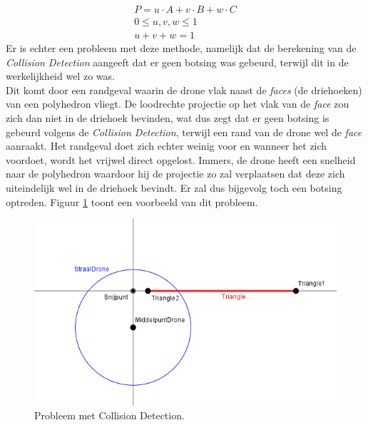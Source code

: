  \begin{gather*}
 	P = u\cdot A + v\cdot B + w\cdot C \\
 	0 \le u,v,w \le 1 \\
 	u + v + w = 1
 \end{gather*}
\noindent
Er is echter een probleem met deze methode, namelijk dat de berekening van de \textit{Collision Detection} aangeeft dat er geen botsing was gebeurd, terwijl dit in de werkelijkheid wel zo was. \\
Dit komt door een randgeval waarin de drone vlak naast de \textit{faces} (de driehoeken) van een polyhedron vliegt. De loodrechte projectie op het vlak van de \textit{face} zou zich dan niet in de driehoek bevinden, wat dus zegt dat er geen botsing is gebeurd volgens de \textit{Collision Detection}, terwijl een rand van de drone wel de \textit{face} aanraakt. Het randgeval doet zich echter weinig voor en wanneer het zich voordoet, wordt het vrijwel direct opgelost. Immers, de drone heeft een snelheid naar de polyhedron waardoor hij de projectie zo zal verplaatsen dat deze zich uiteindelijk wel in de driehoek bevindt. Er zal dus bijgevolg toch een botsing optreden. Figuur \ref{fig:CollisionDetectionProbleem} toont een voorbeeld van dit probleem.

\begin{figure}[H]
	\includegraphics[width=1\textwidth]{Testbed/CollisionDetectionProbleem.png}
	\caption{Probleem met Collision Detection.\\ }
	\label{fig:CollisionDetectionProbleem}
\end{figure}